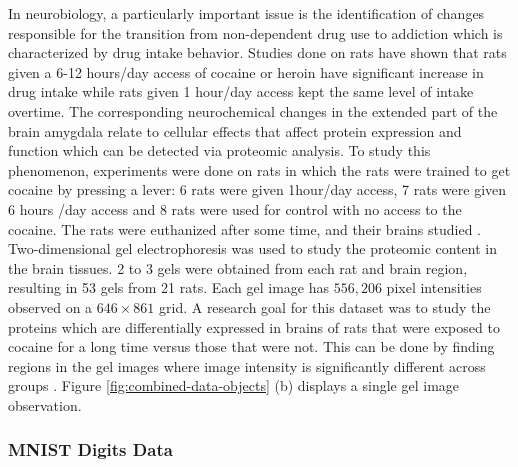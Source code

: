 In neurobiology, a particularly important issue is the identification of changes responsible for the transition from non-dependent drug use to addiction which is characterized by drug intake behavior. Studies done on rats have shown that rats given a 6-12 hours/day access of cocaine or heroin have significant increase in drug intake while rats given 1 hour/day access kept the same level of intake overtime.
The corresponding neurochemical changes in the extended part of the brain amygdala relate to cellular effects that affect protein expression and function which can be detected via proteomic analysis. To study this phenomenon, experiments were done on rats in which the rats were trained to get cocaine by pressing a lever: 6 rats were given 1hour/day access, 7 rats were given 6 hours /day access and 8 rats were used for control with no access to the cocaine. The rats were euthanized after some time, and their brains studied \parencite{morris_pinnacle_2008}. 
Two-dimensional gel electrophoresis was used to study the proteomic content in the brain tissues. 
2 to 3 gels were obtained from each rat and brain region, resulting in 53 gels from 21 rats. 
Each gel image has $556,206$ pixel intensities observed on a $646 × 861$ grid. 
A research goal for this dataset was to study the proteins which are differentially expressed in brains of rats that were exposed to cocaine for a long time versus those that were not. 
This can be done by finding regions in the gel images where image intensity is significantly different across groups \parencite{morris_statistical_2012}. 
Figure \ref{fig:combined-data-objects} (b) displays a single gel image observation.



\subsubsection{MNIST Digits Data}

